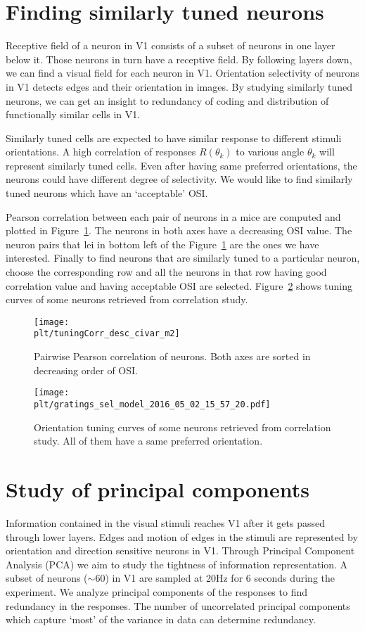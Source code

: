 \documentclass[MTech]{iitmdiss}
\newcommand{\plt}{thesis_plots}
\begin{document}
\section{Finding similarly tuned neurons} %
\label{sec:finding_similarly_tuned_neurons}
Receptive field of a neuron in V1 consists of a subset of neurons in one layer below it. Those neurons in turn have a receptive field. By following layers down, we can find a visual field for each neuron in V1. Orientation selectivity of neurons in V1 detects edges and their orientation in images. By studying similarly tuned neurons, we can get an insight to redundancy of coding and distribution of functionally similar cells in V1.

Similarly tuned cells are expected to have similar response to different stimuli orientations. A high correlation of responses $R(\theta_k)$ to various angle $\theta_k$ will represent similarly tuned cells. Even after having same preferred orientations, the neurons could have different degree of selectivity. We would like to find similarly tuned neurons which have an `acceptable' OSI.

Pearson correlation between each pair of neurons in a mice are computed and plotted in Figure~\ref{fig:corr}. The neurons in both axes have a decreasing OSI value. The neuron pairs that lei in bottom left of the Figure~\ref{fig:corr} are the ones we have interested. Finally to find neurons that are similarly tuned to a particular neuron, choose the corresponding row and all the neurons in that row having good correlation value and having acceptable OSI are selected. Figure~\ref{fig:tunecurves} shows tuning curves of some neurons retrieved from correlation study.
\begin{figure}[h]
  \centering
  \texttt{[image: \\plt/tuningCorr\_desc\_civar\_m2]}
  \caption{Pairwise Pearson correlation of neurons. Both axes are sorted in decreasing order of OSI.}
  \label{fig:corr}
\end{figure}
\begin{figure}[h]
  \centering
  \texttt{[image: \\plt/gratings\_sel\_model\_2016\_05\_02\_15\_57\_20.pdf]}
  \caption{Orientation tuning curves of some neurons retrieved from correlation study. All of them have a same preferred orientation.}
  \label{fig:tunecurves}
\end{figure}

\section{Study of principal components} %
\label{sec:study_of_correlation}
Information contained in the visual stimuli reaches V1 after it gets passed through lower layers. Edges and motion of edges in the stimuli are represented by orientation and direction sensitive neurons in V1. Through Principal Component Analysis (PCA) we aim to study the tightness of information representation. A subset of neurons ($\sim 60$) in V1 are sampled at 20Hz for 6 seconds during the experiment. We analyze principal components of the responses to find redundancy in the responses. The number of uncorrelated principal components which capture `most' of the variance in data can determine redundancy.
\end{document}
